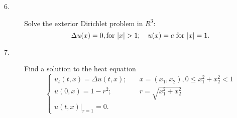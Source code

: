 \documentclass{article}
\begin{document}
\begin{description}
\item[6.]
Solve the exterior Dirichlet problem in $R^3$:
$$\Delta u(x) = 0, \hbox{for\ } |x| > 1; \quad u(x) = c \hbox{\ for\ }
  |x| = 1.$$

\item[7.]
Find a solution to the heat equation
$$\begin{cases}
        u_t(t,x) = \Delta u(t,x) ; \quad &x = (x_1, x_2), 0\leq x^2_1 + x^2_2 <1 \\
        u(0,x) = 1 - r^2; \quad &r = \sqrt{x^2_1 + x^2_2} \\
        u(t,x)|_{r=1} = 0.
        \end{cases}$$





\end{description}    
\end{document}
